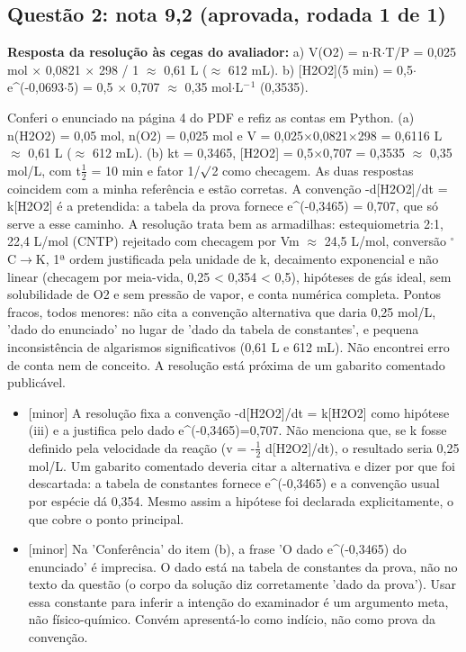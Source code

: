 \documentclass{article}%
\begin{document}
\subsection*{Questão 2: nota 9,2 (aprovada, rodada 1 de 1)}%
\textbf{Resposta da resolução às cegas do avaliador:} a) V(O2) = n$\cdot$R$\cdot$T/P = 0,025 mol $\times$ 0,0821 $\times$ 298 / 1 $\approx$ 0,61 L ($\approx$ 612 mL).\newline%
b) {[}H2O2{]}(5 min) = 0,5$\cdot$e\^{}(-0,0693$\cdot$5) = 0,5 $\times$ 0,707 $\approx$ 0,35 mol$\cdot$L$^{-}$$^{1}$ (0,3535).\par %
Conferi o enunciado na página 4 do PDF e refiz as contas em Python. (a) n(H2O2) = 0,05 mol, n(O2) = 0,025 mol e V = 0,025$\times$0,0821$\times$298 = 0,6116 L $\approx$ 0,61 L ($\approx$ 612 mL). (b) kt = 0,3465, {[}H2O2{]} = 0,5$\times$0,707 = 0,3535 $\approx$ 0,35 mol/L, com t$\frac12$ = 10 min e fator 1/$\surd$2 como checagem. As duas respostas coincidem com a minha referência e estão corretas. A convenção -d{[}H2O2{]}/dt = k{[}H2O2{]} é a pretendida: a tabela da prova fornece e\^{}(-0,3465) = 0,707, que só serve a esse caminho. A resolução trata bem as armadilhas: estequiometria 2:1, 22,4 L/mol (CNTP) rejeitado com checagem por Vm $\approx$ 24,5 L/mol, conversão $^\circ$C$\to$K, 1ª ordem justificada pela unidade de k, decaimento exponencial e não linear (checagem por meia{-}vida, 0,25 < 0,354 < 0,5), hipóteses de gás ideal, sem solubilidade de O2 e sem pressão de vapor, e conta numérica completa. Pontos fracos, todos menores: não cita a convenção alternativa que daria 0,25 mol/L, 'dado do enunciado' no lugar de 'dado da tabela de constantes', e pequena inconsistência de algarismos significativos (0,61 L e 612 mL). Não encontrei erro de conta nem de conceito. A resolução está próxima de um gabarito comentado publicável.%
\begin{itemize}%
\item%
{[}minor{]} A resolução fixa a convenção -d{[}H2O2{]}/dt = k{[}H2O2{]} como hipótese (iii) e a justifica pelo dado e\^{}(-0,3465)=0,707. Não menciona que, se k fosse definido pela velocidade da reação (v = -$\frac12$ d{[}H2O2{]}/dt), o resultado seria 0,25 mol/L. Um gabarito comentado deveria citar a alternativa e dizer por que foi descartada: a tabela de constantes fornece e\^{}(-0,3465) e a convenção usual por espécie dá 0,354. Mesmo assim a hipótese foi declarada explicitamente, o que cobre o ponto principal.%
\item%
{[}minor{]} Na 'Conferência' do item (b), a frase 'O dado e\^{}(-0,3465) do enunciado' é imprecisa. O dado está na tabela de constantes da prova, não no texto da questão (o corpo da solução diz corretamente 'dado da prova'). Usar essa constante para inferir a intenção do examinador é um argumento meta, não físico{-}químico. Convém apresentá{-}lo como indício, não como prova da convenção.%

\end{itemize}$$
\end{document}
